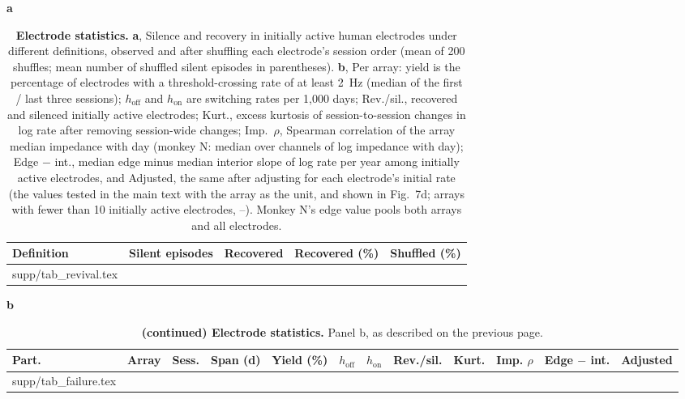 \documentclass[pdflatex,sn-nature]{sn-jnl}
\makeatletter
\newcommand\tabinput[1]{\@@input #1 }
\makeatother
\begin{document}
\begin{landscape}
\begin{table}[p]
\caption{\textbf{Electrode statistics.} \textbf{a}, Silence and recovery in initially active human electrodes under
different definitions, observed and after shuffling each electrode's session order (mean of 200 shuffles; mean number of
shuffled silent episodes in parentheses). \textbf{b}, Per array: yield is the percentage of electrodes with a threshold-crossing rate of at least
2~Hz (median of the first / last three sessions); $h_{\mathrm{off}}$ and $h_{\mathrm{on}}$ are switching rates per
1,000 days; Rev./sil., recovered and silenced initially active electrodes; Kurt., excess kurtosis of
session-to-session changes in log rate after removing session-wide changes; Imp.\ $\rho$, Spearman correlation of
the array median impedance with day (monkey N: median over channels of log impedance with day); Edge $-$ int., median
edge minus median interior slope of log rate per year among initially active electrodes, and Adjusted, the same after
adjusting for each electrode's initial rate (the values tested in the main text with the array as the unit, and shown
in Fig.~7d; arrays with fewer than 10 initially active electrodes, --). Monkey N's edge value pools both arrays and
all electrodes.}
\label{tab:electrodes}
\scriptsize\setlength{\tabcolsep}{3.5pt}
\textbf{a}\\[2pt]
\begin{tabular}{@{}lrrrr@{}}
\toprule
Definition & Silent episodes & Recovered & Recovered (\%) & Shuffled (\%) \\
\midrule
\tabinput{supp/tab_revival.tex}
\botrule
\end{tabular}
\end{table}
\end{landscape}

\begin{landscape}
\begin{table}[p]
\addtocounter{table}{-1}
\caption{\textbf{(continued) Electrode statistics.} Panel b, as described on the previous page.}
\scriptsize\setlength{\tabcolsep}{3.5pt}
\textbf{b}\\[2pt]
\begin{tabular}{@{}llrrrrrrrrrr@{}}
\toprule
Part. & Array & Sess. & Span (d) & Yield (\%) & $h_{\mathrm{off}}$ & $h_{\mathrm{on}}$ & Rev./sil. & Kurt. &
Imp. $\rho$ & Edge $-$ int. & Adjusted \\
\midrule
\tabinput{supp/tab_failure.tex}
\botrule
\end{tabular}
\end{table}
\end{landscape}
\end{document}
